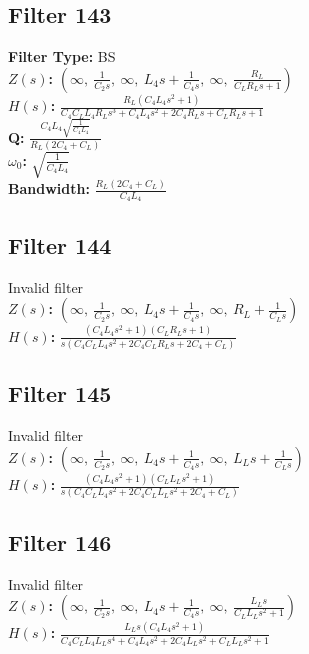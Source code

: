 \documentclass{article}
\begin{document}
\subsection*{Filter 143}
\textbf{Filter Type:} BS \\ 
\textbf{$Z(s)$:} $\left( \infty, \  \frac{1}{C_{2} s}, \  \infty, \  L_{4} s + \frac{1}{C_{4} s}, \  \infty, \  \frac{R_{L}}{C_{L} R_{L} s + 1}\right)$ \\ 
\textbf{$H(s)$:} $\frac{R_{L} \left(C_{4} L_{4} s^{2} + 1\right)}{C_{4} C_{L} L_{4} R_{L} s^{3} + C_{4} L_{4} s^{2} + 2 C_{4} R_{L} s + C_{L} R_{L} s + 1}$ \\ 
\textbf{Q:} $\frac{C_{4} L_{4} \sqrt{\frac{1}{C_{4} L_{4}}}}{R_{L} \left(2 C_{4} + C_{L}\right)}$ \\ 
\textbf{$\omega_0$:} $\sqrt{\frac{1}{C_{4} L_{4}}}$ \\ 
\textbf{Bandwidth:} $\frac{R_{L} \left(2 C_{4} + C_{L}\right)}{C_{4} L_{4}}$ \\ 
\subsection*{Filter 144}
Invalid filter \\ 
\textbf{$Z(s)$:} $\left( \infty, \  \frac{1}{C_{2} s}, \  \infty, \  L_{4} s + \frac{1}{C_{4} s}, \  \infty, \  R_{L} + \frac{1}{C_{L} s}\right)$ \\ 
\textbf{$H(s)$:} $\frac{\left(C_{4} L_{4} s^{2} + 1\right) \left(C_{L} R_{L} s + 1\right)}{s \left(C_{4} C_{L} L_{4} s^{2} + 2 C_{4} C_{L} R_{L} s + 2 C_{4} + C_{L}\right)}$ \\ 
\subsection*{Filter 145}
Invalid filter \\ 
\textbf{$Z(s)$:} $\left( \infty, \  \frac{1}{C_{2} s}, \  \infty, \  L_{4} s + \frac{1}{C_{4} s}, \  \infty, \  L_{L} s + \frac{1}{C_{L} s}\right)$ \\ 
\textbf{$H(s)$:} $\frac{\left(C_{4} L_{4} s^{2} + 1\right) \left(C_{L} L_{L} s^{2} + 1\right)}{s \left(C_{4} C_{L} L_{4} s^{2} + 2 C_{4} C_{L} L_{L} s^{2} + 2 C_{4} + C_{L}\right)}$ \\ 
\subsection*{Filter 146}
Invalid filter \\ 
\textbf{$Z(s)$:} $\left( \infty, \  \frac{1}{C_{2} s}, \  \infty, \  L_{4} s + \frac{1}{C_{4} s}, \  \infty, \  \frac{L_{L} s}{C_{L} L_{L} s^{2} + 1}\right)$ \\ 
\textbf{$H(s)$:} $\frac{L_{L} s \left(C_{4} L_{4} s^{2} + 1\right)}{C_{4} C_{L} L_{4} L_{L} s^{4} + C_{4} L_{4} s^{2} + 2 C_{4} L_{L} s^{2} + C_{L} L_{L} s^{2} + 1}$ \\ 
\end{document}
